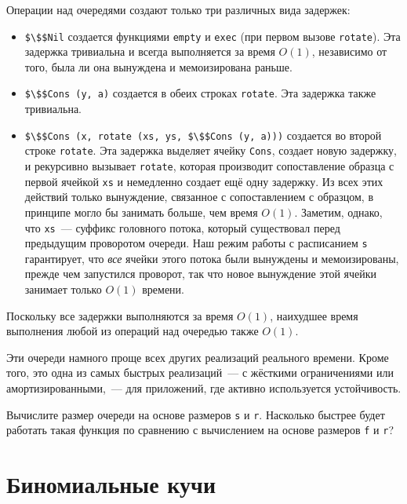 Операции над очередями создают только три различных вида задержек:
\begin{itemize}
\item \lstinline!$\$$Nil! создается функциями \lstinline!empty! и
  \lstinline!exec! (при первом вызове \lstinline!rotate!). Эта
  задержка тривиальна и всегда выполняется за время $O(1)$, независимо
  от того, была ли она вынуждена и мемоизирована раньше.
\item \lstinline!$\$$Cons (y, a)! создается в обеих строках
  \lstinline!rotate!. Эта задержка также тривиальна.
\item \lstinline!$\$$Cons (x, rotate (xs, ys, $\$$Cons (y, a)))!
  создается во второй строке \lstinline!rotate!. Эта задержка выделяет
  ячейку \lstinline!Cons!, создает новую задержку, и рекурсивно
  вызывает \lstinline!rotate!, которая производит сопоставление
  образца с первой ячейкой \lstinline!xs! и немедленно создает ещё
  одну задержку. Из всех этих действий только вынуждение, связанное с
  сопоставлением с образцом, в принципе могло бы занимать больше, чем
  время $O(1)$. Заметим, однако, что \lstinline!xs!~--- суффикс
  головного потока, который существовал перед предыдущим проворотом
  очереди. Наш режим работы с расписанием \lstinline!s! гарантирует,
  что \emph{все} ячейки этого потока были вынуждены и мемоизированы,
  прежде чем запустился проворот, так что новое вынуждение этой ячейки
  занимает только $O(1)$ времени.
\end{itemize}
Поскольку все задержки выполняются за время $O(1)$, наихудшее время
выполнения любой из операций над очередью также $O(1)$.

\begin{hint}
  Эти очереди намного проще всех других реализаций реального
  времени. Кроме того, это одна из самых быстрых реализаций~--- с
  жёсткими ограничениями или амортизированными,~--- для приложений,
  где активно используется устойчивость.
\end{hint}

\begin{exercise}\label{ex:7.2}
  Вычислите размер очереди на основе размеров \lstinline!s! и
  \lstinline!r!. Насколько быстрее будет работать такая функция по
  сравнению с вычислением на основе размеров \lstinline!f! и
  \lstinline!r!?
\end{exercise}

\section{Биномиальные кучи}
\label{sc:7.3}

